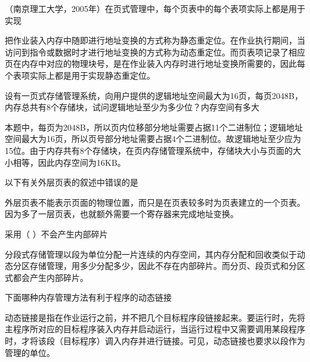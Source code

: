 \question （南京理工大学，2005年）在页式管理中，每个页表中的每个表项实际上都是用于实现
\par{}
\begin{solution}把作业装入内存中随即进行地址变换的方式称为静态重定位。在作业执行期间，当访问到指令或数据时才进行地址变换的方式称为动态重定位。而页表项记录了相应页在内存中对应的物理块号，是在作业装入内存时进行地址变换所需要的，因此每个表项实际上都是用于实现静态重定位。
\end{solution}
\question 设有一页式存储管理系统，向用户提供的逻辑地址空间最大为16页，每页2048B，内存总共有8个存储块，试问逻辑地址至少为多少位？内存空间有多大
\par{}
\begin{solution}本题中，每页为2048B，所以页内位移部分地址需要占据11个二进制位；逻辑地址空间最大为16页，所以页号部分地址需要占据4个二进制位。故逻辑地址至少应为15位。由于内存共有8个存储块，在页内存储管理系统中，存储块大小与页面的大小相等，因此内存空间为16KB。
\end{solution}
\question 以下有关外层页表的叙述中错误的是
\par{}
\begin{solution}外层页表不能表示页面的物理位置，而只是在页表较多时为页表建立的一个页表。因为多了一层页表，也就额外需要一个寄存器来完成地址变换。
\end{solution}
\question 采用（ ）不会产生内部碎片
\par{}
\begin{solution}分段式存储管理以段为单位分配一片连续的内存空间，其内存分配和回收类似于动态分区存储管理，用多少分配多少，因此不存在内部碎片。而分页、段页式和分区式都会产生内部碎片。
\end{solution}
\question 下面哪种内存管理方法有利于程序的动态链接
\par{}
\begin{solution}动态链接是指在作业运行之前，并不把几个目标程序段链接起来。要运行时，先将主程序所对应的目标程序装入内存并启动运行，当运行过程中又需要调用某段程序时，才将该段（目标程序）调入内存并进行链接。可见，动态链接也要求以段作为管理的单位。
\end{solution}

